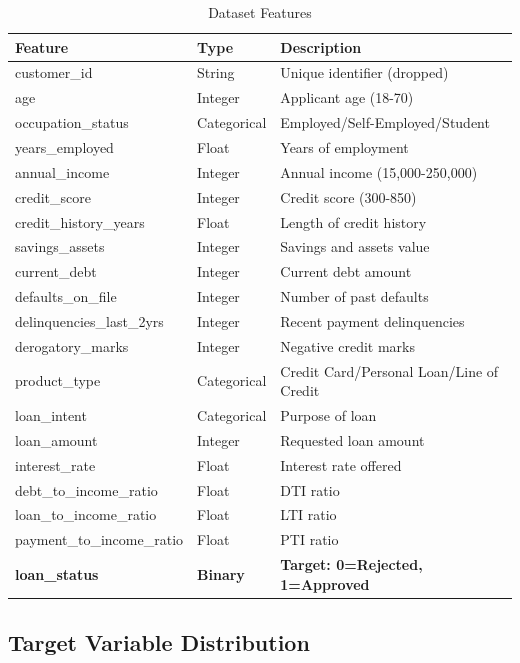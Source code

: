 \documentclass[12pt,a4paper]{article}
\begin{document}
\begin{table}[H]
\centering
\caption{Dataset Features}
\begin{tabular}{lll}
\toprule
\textbf{Feature} & \textbf{Type} & \textbf{Description} \\
\midrule
customer\_id & String & Unique identifier (dropped) \\
age & Integer & Applicant age (18-70) \\
occupation\_status & Categorical & Employed/Self-Employed/Student \\
years\_employed & Float & Years of employment \\
annual\_income & Integer & Annual income (15,000-250,000) \\
credit\_score & Integer & Credit score (300-850) \\
credit\_history\_years & Float & Length of credit history \\
savings\_assets & Integer & Savings and assets value \\
current\_debt & Integer & Current debt amount \\
defaults\_on\_file & Integer & Number of past defaults \\
delinquencies\_last\_2yrs & Integer & Recent payment delinquencies \\
derogatory\_marks & Integer & Negative credit marks \\
product\_type & Categorical & Credit Card/Personal Loan/Line of Credit \\
loan\_intent & Categorical & Purpose of loan \\
loan\_amount & Integer & Requested loan amount \\
interest\_rate & Float & Interest rate offered \\
debt\_to\_income\_ratio & Float & DTI ratio \\
loan\_to\_income\_ratio & Float & LTI ratio \\
payment\_to\_income\_ratio & Float & PTI ratio \\
\textbf{loan\_status} & \textbf{Binary} & \textbf{Target: 0=Rejected, 1=Approved} \\
\bottomrule
\end{tabular}
\end{table}

\subsection{Target Variable Distribution}
\end{document}
